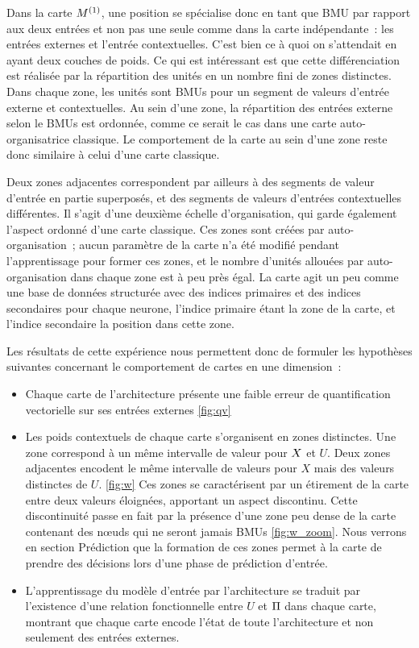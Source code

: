 \documentclass[../main]{subfiles}
\begin{document}
Dans la carte $M^{({1})}$, une position se spécialise donc en tant que BMU par rapport aux deux entrées et non pas une seule comme dans la carte indépendante~: les entrées externes et l'entrée contextuelles. C'est bien ce à quoi on s'attendait en ayant deux couches de poids. Ce qui est intéressant est que cette différenciation est réalisée par la répartition des unités en un nombre fini de zones distinctes. Dans chaque zone, les unités sont BMUs pour un segment de valeurs d'entrée externe et contextuelles. Au sein d'une zone, la répartition des entrées externe selon le BMUs est ordonnée, comme ce serait le cas dans une carte auto-organisatrice classique. Le comportement de la carte au sein d'une zone reste donc similaire à celui d'une carte classique.

Deux zones adjacentes correspondent par ailleurs à des segments de valeur d'entrée en partie superposés, et des segments de valeurs d'entrées contextuelles différentes. Il s'agit d'une deuxième échelle d'organisation, qui garde également l'aspect ordonné d'une carte classique. Ces zones sont créées par auto-organisation~; aucun paramètre de la carte n'a été modifié pendant l'apprentissage pour former ces zones, et le nombre d'unités allouées par auto-organisation dans chaque zone est à peu près égal. La carte agit un peu comme une base de données structurée avec des indices primaires et des indices secondaires pour chaque neurone, l'indice primaire étant la zone de la carte, et l'indice secondaire la position dans cette zone.

Les résultats de cette expérience nous permettent donc de formuler les hypothèses suivantes concernant le comportement de cartes en une dimension~:

\begin{itemize}
	\item Chaque carte de l'architecture présente une faible erreur de quantification vectorielle sur ses entrées externes \ref{fig:qv}
	\item Les poids contextuels de chaque carte s'organisent en zones distinctes. Une zone correspond à un même intervalle de valeur pour $X$ et $U$. Deux zones adjacentes encodent le même intervalle de valeurs pour $X$ mais des valeurs distinctes de $U$. \ref{fig:w} Ces zones se caractérisent par un étirement de la carte entre deux valeurs éloignées, apportant un aspect discontinu. Cette discontinuité passe en fait par la présence d'une zone peu dense de la carte contenant des n\oe{}uds qui ne seront jamais BMUs \ref{fig:w_zoom}. Nous verrons en section Prédiction que la formation de ces zones permet à la carte de prendre des décisions lors d'une phase de prédiction d'entrée.
	\item L'apprentissage du modèle d'entrée par l'architecture se traduit par l'existence d'une relation fonctionnelle entre $U$ et $\Pi$ dans chaque carte, montrant que chaque carte encode l'état de toute l'architecture et non seulement des entrées externes.
\end{itemize}
\end{document}

